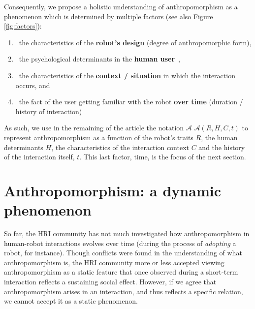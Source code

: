 \documentclass{frontiersSCNS} %
\newcommand{\Ant}[1][]{%
      \ifthenelse{\isempty{#1}}%
        {$\mathcal{A}$}
        {$\mathcal{A}(#1)$}
}
\begin{document}
Consequently, we propose a holistic understanding of anthropomorphism as a
phenomenon which is determined by multiple factors (see also Figure
\ref{fig:factors}):

\begin{enumerate}

\item ~the characteristics of the \textbf{robot's design} (degree of
    anthropomorphic form),

\item ~the psychological determinants in the \textbf{human
    user}~\citep{epley_seeing_2007},

\item ~the characteristics of the \textbf{context / situation} in which the
    interaction occurs, and

\item ~the fact of the user getting familiar with the robot \textbf{over time}
    (duration / history of interaction)

\end{enumerate}

As such, we use in the remaining of the article the notation \Ant[R,H,C,t] to
represent anthropomorphism as a function of the robot's traits $R$, the human
determinants $H$, the characteristics of the interaction context $C$ and the
history of the interaction itself, $t$. This last factor, time, is the focus of
the next section.

%
%
%
%
%
%

\section{Anthropomorphism: a dynamic phenomenon}
\label{sec:our-ideas}

So far, the HRI community has not much investigated how anthropomorphism in
human-robot interactions evolves over time (during the process of
\emph{adopting} a robot, for instance). Though conflicts were found in the
understanding of what anthropomorphism is, the HRI community more or less
accepted viewing anthropomorphism as a static feature that once observed during
a short-term interaction reflects a sustaining social effect. However, if we
agree that anthropomorphism arises in an interaction, and thus reflects a
specific relation, we cannot accept it as a static phenomenon.
\end{document}
